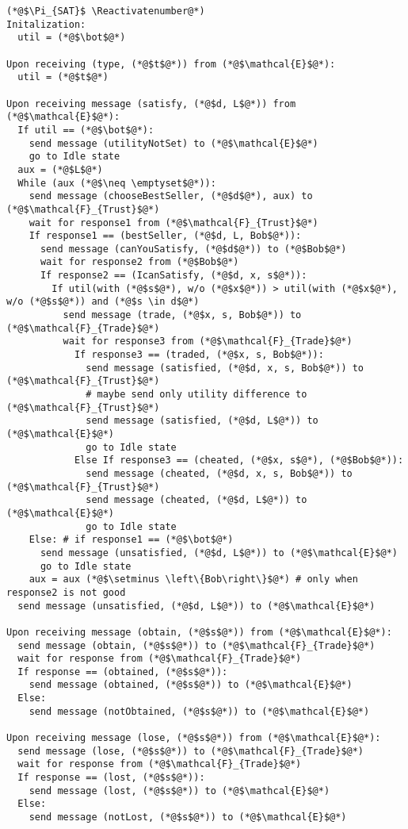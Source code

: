 \Suppressnumber
\begin{lstlisting}[label=satprot, style=numbers]
(*@$\Pi_{SAT}$ \Reactivatenumber@*)
Initalization:
  util = (*@$\bot$@*)

Upon receiving (type, (*@$t$@*)) from (*@$\mathcal{E}$@*):
  util = (*@$t$@*)

Upon receiving message (satisfy, (*@$d, L$@*)) from (*@$\mathcal{E}$@*):
  If util == (*@$\bot$@*):
    send message (utilityNotSet) to (*@$\mathcal{E}$@*)
    go to Idle state
  aux = (*@$L$@*)
  While (aux (*@$\neq \emptyset$@*)):
    send message (chooseBestSeller, (*@$d$@*), aux) to (*@$\mathcal{F}_{Trust}$@*)
    wait for response1 from (*@$\mathcal{F}_{Trust}$@*)
    If response1 == (bestSeller, (*@$d, L, Bob$@*)):
      send message (canYouSatisfy, (*@$d$@*)) to (*@$Bob$@*)
      wait for response2 from (*@$Bob$@*)
      If response2 == (IcanSatisfy, (*@$d, x, s$@*)):
        If util(with (*@$s$@*), w/o (*@$x$@*)) > util(with (*@$x$@*), w/o (*@$s$@*)) and (*@$s \in d$@*)
          send message (trade, (*@$x, s, Bob$@*)) to (*@$\mathcal{F}_{Trade}$@*)
          wait for response3 from (*@$\mathcal{F}_{Trade}$@*)
            If response3 == (traded, (*@$x, s, Bob$@*)):
              send message (satisfied, (*@$d, x, s, Bob$@*)) to (*@$\mathcal{F}_{Trust}$@*)
              # maybe send only utility difference to (*@$\mathcal{F}_{Trust}$@*)
              send message (satisfied, (*@$d, L$@*)) to (*@$\mathcal{E}$@*)
              go to Idle state
            Else If response3 == (cheated, (*@$x, s$@*), (*@$Bob$@*)):
              send message (cheated, (*@$d, x, s, Bob$@*)) to (*@$\mathcal{F}_{Trust}$@*)
              send message (cheated, (*@$d, L$@*)) to (*@$\mathcal{E}$@*)
              go to Idle state
    Else: # if response1 == (*@$\bot$@*)
      send message (unsatisfied, (*@$d, L$@*)) to (*@$\mathcal{E}$@*)
      go to Idle state
    aux = aux (*@$\setminus \left\{Bob\right\}$@*) # only when response2 is not good
  send message (unsatisfied, (*@$d, L$@*)) to (*@$\mathcal{E}$@*)

Upon receiving message (obtain, (*@$s$@*)) from (*@$\mathcal{E}$@*):
  send message (obtain, (*@$s$@*)) to (*@$\mathcal{F}_{Trade}$@*)
  wait for response from (*@$\mathcal{F}_{Trade}$@*)
  If response == (obtained, (*@$s$@*)):
    send message (obtained, (*@$s$@*)) to (*@$\mathcal{E}$@*)
  Else:
    send message (notObtained, (*@$s$@*)) to (*@$\mathcal{E}$@*)

Upon receiving message (lose, (*@$s$@*)) from (*@$\mathcal{E}$@*):
  send message (lose, (*@$s$@*)) to (*@$\mathcal{F}_{Trade}$@*)
  wait for response from (*@$\mathcal{F}_{Trade}$@*)
  If response == (lost, (*@$s$@*)):
    send message (lost, (*@$s$@*)) to (*@$\mathcal{E}$@*)
  Else:
    send message (notLost, (*@$s$@*)) to (*@$\mathcal{E}$@*)


\end{lstlisting}
